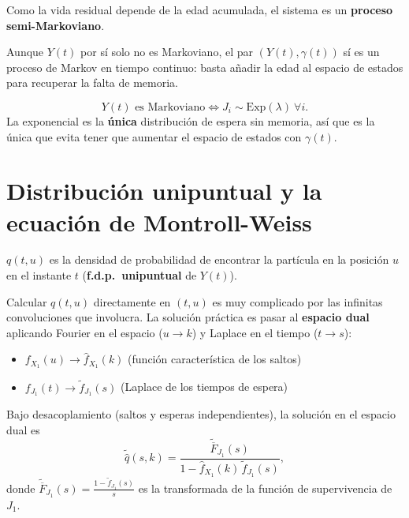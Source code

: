 \documentclass[10pt]{book}
\begin{document}
\noindent
Como la vida residual depende de la edad acumulada, el sistema es un \textbf{proceso semi-Markoviano}.

\begin{prop}
Aunque $Y(t)$ por sí solo no es Markoviano, el par $(Y(t),\gamma(t))$ sí es un proceso de Markov en tiempo continuo: basta añadir la edad al espacio de estados para recuperar la falta de memoria.
\end{prop}

\begin{prop}
\begin{equation*}
    Y(t) \text{ es Markoviano} \iff J_i\sim \mathrm{Exp}(\lambda)\ \forall i.
\end{equation*}
La exponencial es la \textbf{única} distribución de espera sin memoria, así que es la única que evita tener que aumentar el espacio de estados con $\gamma(t)$.
\end{prop}

\section{Distribución unipuntual y la ecuación de Montroll-Weiss}

\begin{definicion}
$q(t,u)$ es la densidad de probabilidad de encontrar la partícula en la posición $u$ en el instante $t$ (\textbf{f.d.p.\ unipuntual} de $Y(t)$).
\end{definicion}

\noindent
Calcular $q(t,u)$ directamente en $(t,u)$ es muy complicado por las infinitas convoluciones que involucra. La solución práctica es pasar al \textbf{espacio dual} aplicando Fourier en el espacio ($u\to k$) y Laplace en el tiempo ($t\to s$):

\begin{itemize}
    \item $f_{X_1}(u) \to \hat f_{X_1}(k)$ (función característica de los saltos)
    \item $f_{J_1}(t) \to \widetilde f_{J_1}(s)$ (Laplace de los tiempos de espera)
\end{itemize}

\begin{teo}
Bajo desacoplamiento (saltos y esperas independientes), la solución en el espacio dual es
\begin{equation*}
    \widetilde{\hat q}(s,k) = \frac{\widetilde{\overline F}_{J_1}(s)}{1-\hat f_{X_1}(k)\,\widetilde f_{J_1}(s)},
\end{equation*}
donde $\widetilde{\overline F}_{J_1}(s)=\frac{1-\widetilde f_{J_1}(s)}{s}$ es la transformada de la función de supervivencia de $J_1$.
\end{teo}
\end{document}
